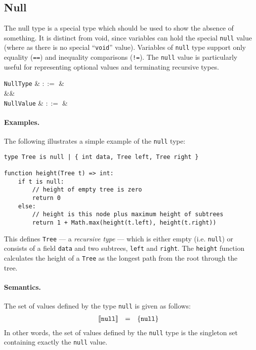 
\subsection{Null}

The null type is a special type which should be used to show the absence of something. It is distinct from void, since variables can hold the special \lstinline{null} value (where as there is no special ``\lstinline{void}'' value).  Variables of \lstinline{null} type support only equality (\lstinline{==}) and inequality comparisons (\lstinline{!=}).  The \lstinline{null} value is particularly useful for representing optional values and terminating recursive types.

\begin{syntax}
  \verb+NullType+ & $::=$ &  \\
  &&\\
  \verb+NullValue+ & $::=$ &  \\
\end{syntax}

\paragraph{Examples.}  The following illustrates a simple example of the \lstinline{null} type:

\begin{lstlisting}
type Tree is null | { int data, Tree left, Tree right }

function height(Tree t) => int:
    if t is null:
        // height of empty tree is zero
        return 0
    else:
        // height is this node plus maximum height of subtrees
        return 1 + Math.max(height(t.left), height(t.right))
\end{lstlisting}
This defines \lstinline{Tree} --- a {\em recursive type} --- which is either empty (i.e. \lstinline{null}) or consists of a field \lstinline{data} and two subtrees, \lstinline{left} and \lstinline{right}.  The \lstinline{height} function calculates the height of a \lstinline{Tree} as the longest path from the root through the tree.

\paragraph{Semantics.}  The set of values defined by the type \lstinline{null} is given as follows:
\begin{displaymath}
\begin{array}{rcl}
\llbracket{\tt null}\rrbracket & = & \{{\tt null}\}\\
\end{array}
\end{displaymath}
In other words, the set of values defined by the \lstinline{null} type is the singleton set containing exactly the \lstinline{null} value.


